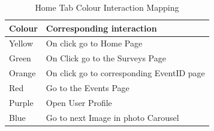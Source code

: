 \documentclass[12pt]{article}
\begin{document}
\begin{table}[H]
\centering
\caption{Home Tab Colour Interaction Mapping}
\label{tab:home-tab-colour-interactions}
\begin{tabularx}{\textwidth}{lX}
\toprule
\textbf{Colour} & \textbf{Corresponding interaction}\\
\midrule
\rowcolor{yellow!75} Yellow & On click go to Home Page\\
\rowcolor{green!15} Green & On Click go to the Surveys Page\\
\rowcolor{orange!25} Orange & On click go to corresponding EventID page\\
\rowcolor{red!50} Red & Go to the Events Page\\
\rowcolor{violet!75} Purple & Open User Profile\\
\rowcolor{blue!60} Blue & Go to next Image in photo Carousel\\
\bottomrule
\end{tabularx}
\end{table}
\end{document}
